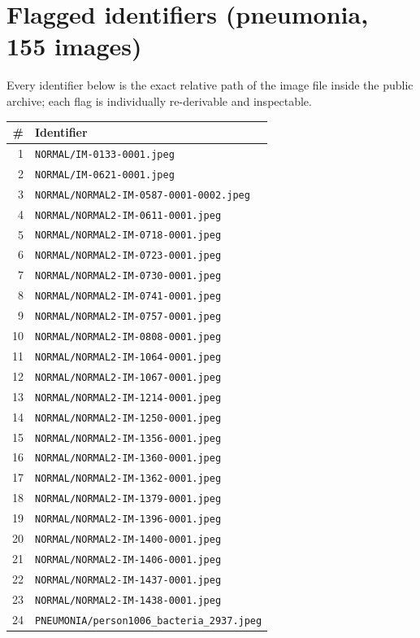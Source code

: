 
\section{Flagged identifiers (pneumonia, 155 images)}
Every identifier below is the exact relative path of the image file inside
the public archive; each flag is individually re-derivable and inspectable.
\begin{longtable}{r p{12cm}}
\hline \# & Identifier \\ \hline \endhead
1 & \texttt{NORMAL/IM-0133-0001.jpeg} \\
2 & \texttt{NORMAL/IM-0621-0001.jpeg} \\
3 & \texttt{NORMAL/NORMAL2-IM-0587-0001-0002.jpeg} \\
4 & \texttt{NORMAL/NORMAL2-IM-0611-0001.jpeg} \\
5 & \texttt{NORMAL/NORMAL2-IM-0718-0001.jpeg} \\
6 & \texttt{NORMAL/NORMAL2-IM-0723-0001.jpeg} \\
7 & \texttt{NORMAL/NORMAL2-IM-0730-0001.jpeg} \\
8 & \texttt{NORMAL/NORMAL2-IM-0741-0001.jpeg} \\
9 & \texttt{NORMAL/NORMAL2-IM-0757-0001.jpeg} \\
10 & \texttt{NORMAL/NORMAL2-IM-0808-0001.jpeg} \\
11 & \texttt{NORMAL/NORMAL2-IM-1064-0001.jpeg} \\
12 & \texttt{NORMAL/NORMAL2-IM-1067-0001.jpeg} \\
13 & \texttt{NORMAL/NORMAL2-IM-1214-0001.jpeg} \\
14 & \texttt{NORMAL/NORMAL2-IM-1250-0001.jpeg} \\
15 & \texttt{NORMAL/NORMAL2-IM-1356-0001.jpeg} \\
16 & \texttt{NORMAL/NORMAL2-IM-1360-0001.jpeg} \\
17 & \texttt{NORMAL/NORMAL2-IM-1362-0001.jpeg} \\
18 & \texttt{NORMAL/NORMAL2-IM-1379-0001.jpeg} \\
19 & \texttt{NORMAL/NORMAL2-IM-1396-0001.jpeg} \\
20 & \texttt{NORMAL/NORMAL2-IM-1400-0001.jpeg} \\
21 & \texttt{NORMAL/NORMAL2-IM-1406-0001.jpeg} \\
22 & \texttt{NORMAL/NORMAL2-IM-1437-0001.jpeg} \\
23 & \texttt{NORMAL/NORMAL2-IM-1438-0001.jpeg} \\
24 & \texttt{PNEUMONIA/person1006\_bacteria\_2937.jpeg} \\

\end{longtable}
